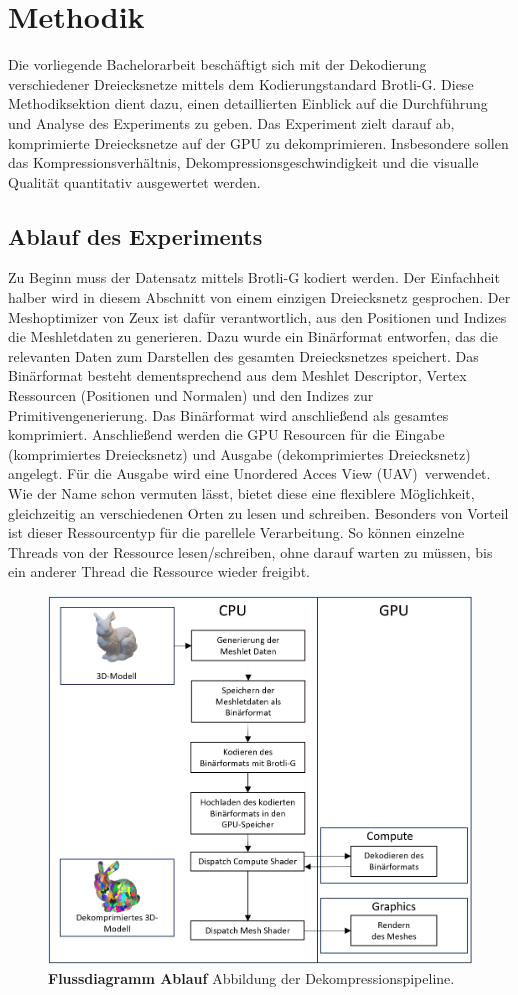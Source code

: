 \section{Methodik}
\label{sec:methodik}

Die vorliegende Bachelorarbeit beschäftigt sich mit der Dekodierung verschiedener Dreiecksnetze mittels dem Kodierungstandard Brotli-G.
Diese Methodiksektion dient dazu, einen detaillierten Einblick auf die Durchführung und Analyse des Experiments zu geben.
Das Experiment zielt darauf ab, komprimierte Dreiecksnetze auf der GPU zu dekomprimieren.
Insbesondere sollen das Kompressionsverhältnis, Dekompressionsgeschwindigkeit und die visualle Qualität quantitativ ausgewertet werden.

\subsection{Ablauf des Experiments}
\label{subsec:ablauf}
Zu Beginn muss der Datensatz mittels Brotli-G kodiert werden.
Der Einfachheit halber wird in diesem Abschnitt von einem einzigen Dreiecksnetz gesprochen.
Der Meshoptimizer von Zeux \cite{Zeux} ist dafür verantwortlich, aus den Positionen und Indizes die Meshletdaten zu generieren.
Dazu wurde ein Binärformat entworfen, das die relevanten Daten zum Darstellen des gesamten Dreiecksnetzes speichert.
Das Binärformat besteht dementsprechend aus dem Meshlet Descriptor, Vertex Ressourcen (Positionen und Normalen) und den Indizes zur Primitivengenerierung.
Das Binärformat wird anschließend als gesamtes komprimiert.
Anschließend werden die GPU Resourcen für die Eingabe (komprimiertes Dreiecksnetz) und Ausgabe (dekomprimiertes Dreiecksnetz) angelegt.
Für die Ausgabe wird eine \glqq Unordered Acces View (UAV)\grqq\ verwendet.
Wie der Name schon vermuten lässt, bietet diese eine flexiblere Möglichkeit, gleichzeitig an verschiedenen Orten zu lesen und schreiben.
Besonders von Vorteil ist dieser Ressourcentyp für die parellele Verarbeitung.
So können einzelne Threads von der Ressource lesen/schreiben, ohne darauf warten zu müssen, bis ein anderer Thread die Ressource wieder freigibt.

\begin{figure}[htb]
  \centering  
  \includegraphics[scale=0.6]{Bilder/Ablauf_Projekt.png}
  \caption[Flussdiagramm Ablauf]{\textbf{Flussdiagramm Ablauf} Abbildung der Dekompressionspipeline.}
  \label{fig:projekt}
\end{figure}